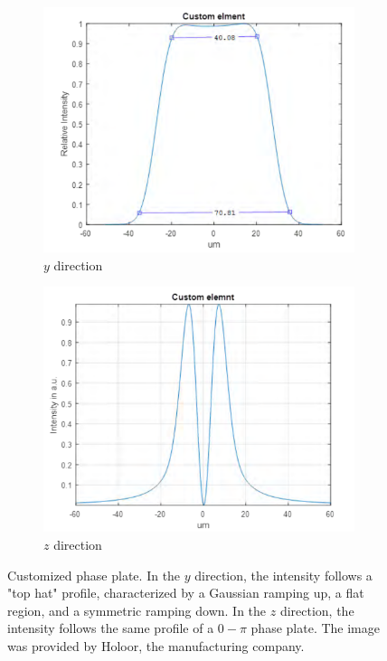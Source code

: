 \begin{figure}
    \begin{subfigure}{0.5\textwidth}
        \centering
        \includegraphics[width=\textwidth]{chapters/chapter_2/figures/tophatx.png}
        \caption{$y$ direction}
        \label{fig:tophaty}
    \end{subfigure}
    \begin{subfigure}{0.5\textwidth}
        \centering
        \includegraphics[width=\textwidth]{chapters/chapter_2/figures/tophaty.png}
        \caption{$z$ direction}
        \label{fig:tophatz}
    \end{subfigure}
    \caption{Customized phase plate. In the $y$ direction, the intensity follows a "top hat" profile, characterized by a Gaussian ramping up, a flat region, and a symmetric ramping down. In the $z$ direction, the intensity follows the same profile of a $0-\pi$ phase plate. The image was provided by Holoor, the manufacturing company.}
    \label{fig:tophat}
\end{figure}

